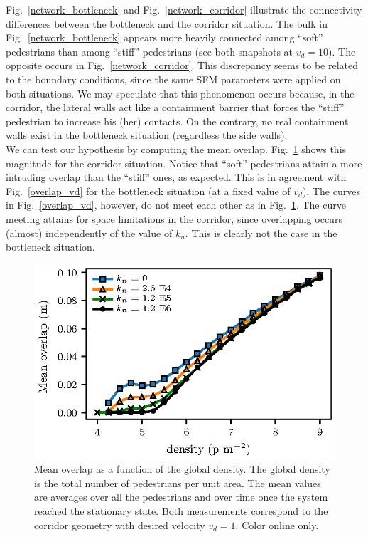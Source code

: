 \documentclass[preprint,12pt]{elsarticle}
\begin{document}
Fig.~\ref{network_bottleneck} and 
Fig.~\ref{network_corridor} illustrate the connectivity differences between 
the bottleneck and the corridor situation. The bulk in 
Fig.~\ref{network_bottleneck} appears more heavily connected among ``soft'' 
pedestrians than among ``stiff'' pedestrians (see both snapshots at $v_d=10$). 
The opposite occurs in Fig.~\ref{network_corridor}. This discrepancy seems to 
be related to the boundary conditions, since the same SFM parameters were 
applied on both situations. We may speculate that this phenomenon occurs 
because, in the corridor, the lateral walls act like a containment barrier that 
forces the ``stiff'' pedestrian to increase his (her) contacts. On the contrary, 
no real containment walls exist in the bottleneck situation (regardless the side 
walls). \\



We can test our hypothesis by computing the mean overlap. 
Fig.~\ref{overlap_dens} shows this magnitude for the corridor situation. Notice 
that ``soft'' pedestrians attain a more intruding overlap than the ``stiff'' 
ones, as expected. This is in agreement with Fig.~\ref{overlap_vd} for the 
bottleneck situation (at a fixed value of $v_d$). The curves in 
Fig.~\ref{overlap_vd}, however, do not meet each other as in  
Fig.~\ref{overlap_dens}. The curve meeting attains for space limitations in 
the corridor, since overlapping occurs (almost) independently of the value of
$k_n$. This is clearly not the case in the bottleneck situation. \\



\begin{figure}[htbp!]
\centering
\includegraphics[width=0.7\columnwidth]
{./overlap_vs_dens_multi_kn.eps}
\caption{\label{overlap_dens} Mean overlap as a function of the 
global density. The global density is the total number of pedestrians per unit 
area. The mean values are averages over all the pedestrians and over time once 
the system reached the stationary state. Both measurements correspond to 
the corridor geometry with desired velocity $v_d=1$. Color 
online only. }
\end{figure}
\end{document}
